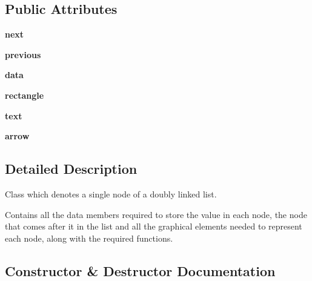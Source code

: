 \subsection*{Public Attributes}
\begin{DoxyCompactItemize}
\item 
\mbox{\label{class_doubly_linked_list_1_1_doubly_linked_list_node_aa1324f7ccd6690bc28beb7755270960d}} 
{\bfseries next}
\item 
\mbox{\label{class_doubly_linked_list_1_1_doubly_linked_list_node_a08009b0fb62aa463ef034f551a865590}} 
{\bfseries previous}
\item 
\mbox{\label{class_doubly_linked_list_1_1_doubly_linked_list_node_a5a231421b19ea697ffb2572af6708430}} 
{\bfseries data}
\item 
\mbox{\label{class_doubly_linked_list_1_1_doubly_linked_list_node_a12638afe1a4790a5aaf2ee6ebefcd76a}} 
{\bfseries rectangle}
\item 
\mbox{\label{class_doubly_linked_list_1_1_doubly_linked_list_node_a07d194bad81a001628b082aedcfab300}} 
{\bfseries text}
\item 
\mbox{\label{class_doubly_linked_list_1_1_doubly_linked_list_node_a10c654bef2e8e8773795b66cee4f1475}} 
{\bfseries arrow}
\end{DoxyCompactItemize}


\subsection{Detailed Description}
Class which denotes a single node of a doubly linked list. 

Contains all the data members required to store the value in each node, the node that comes after it in the list and all the graphical elements needed to represent each node, along with the required functions. 

\subsection{Constructor \& Destructor Documentation}
\mbox{\label{class_doubly_linked_list_1_1_doubly_linked_list_node_aefc467f9e00150472256bfef2a7f5b73}} 
